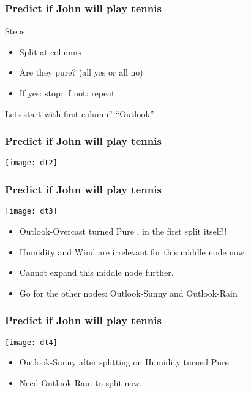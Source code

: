 \begin{frame}[fragile]\frametitle{Predict if John will play tennis}
Steps:
	\begin{itemize}
	\item Split at columns
 	\item Are	they pure? (all yes or all no)	
 	\item If yes: stop; if not: repeat
	\end{itemize}

Lets start with first column'' ``Outlook''
\end{frame}

\begin{frame}[fragile]\frametitle{Predict if John will play tennis}
\begin{center}
\texttt{[image: dt2]}
\end{center}
\end{frame}


\begin{frame}[fragile]\frametitle{Predict if John will play tennis}
\begin{center}
\texttt{[image: dt3]}
\end{center}
	\begin{itemize}
	\item Outlook-Overcast turned Pure , in the first split itself!!
	\item Humidity and Wind are irrelevant for this middle node now.
	\item Cannot expand this middle node further. 
	\item Go for the other nodes: Outlook-Sunny and Outlook-Rain
	\end{itemize}
\end{frame}

\begin{frame}[fragile]\frametitle{Predict if John will play tennis}
\begin{center}
\texttt{[image: dt4]}
\end{center}
	\begin{itemize}
	\item Outlook-Sunny after splitting on Humidity turned Pure
	\item Need Outlook-Rain to split now.
	\end{itemize}

\end{frame}


